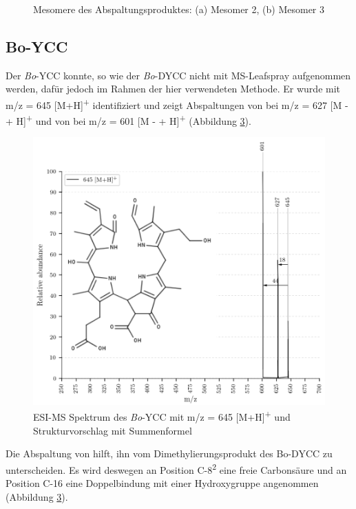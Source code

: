 \begin{figure}[!htbp]
\begin{subfigure}[b]{0.5\textwidth}
    \caption{}
    \label{fig:311MHMesomer3}
  \end{subfigure}
  \caption[2 Mesomere für potentielle Abspaltungsprodukte von \textit{Bo}-DNCC, Quelle: Autor]{Mesomere des Abspaltungsproduktes: (a) Mesomer 2, (b) Mesomer 3}
\end{figure}

\pagebreak
\subsection{Bo-YCC}

Der \textit{Bo}-YCC konnte, so wie der \textit{Bo}-DYCC nicht mit MS-Leafspray aufgenommen werden, dafür jedoch im Rahmen der hier verwendeten Methode. Er wurde mit m/z = 645 [M+H]\textsuperscript{+} identifiziert und zeigt Abspaltungen von  bei m/z = 627 [M -  + H]\textsuperscript{+} und von  bei m/z = 601 [M -  + H]\textsuperscript{+} (Abbildung \ref{fig:645MH}). 

\begin{figure}[!htbp]
  \centering
  \includegraphics[width=\textwidth, height=0.8\textwidth]{figures/Kapitel7/Kataboliten/VWA_MS_645-12.png}
  \caption[ESI-MS Spektrum des \textit{Bo}-YCC, Quelle: Autor]{ESI-MS Spektrum des \textit{Bo}-YCC mit m/z = 645 [M+H]\textsuperscript{+} und Strukturvorschlag mit Summenformel }
  \label{fig:645MH}
\end{figure}

Die Abspaltung von  hilft, ihn vom Dimethylierungsprodukt des Bo-DYCC zu unterscheiden. Es wird deswegen an Position C-8\textsuperscript{2} eine freie Carbonsäure und an Position C-16 eine Doppelbindung mit einer Hydroxygruppe angenommen (Abbildung \ref{fig:645MH}).



